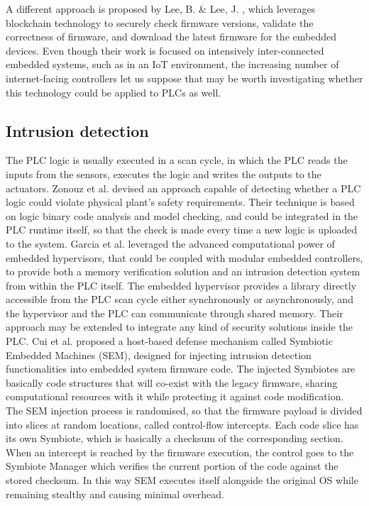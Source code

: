 A different approach is proposed by Lee, B. \& Lee, J. \cite{blockchain}, which leverages blockchain technology to securely check firmware versions,
validate the correctness of firmware, and download the latest firmware for the embedded devices.
Even though their work is focused on intensively inter-connected embedded systems, such as in an IoT environment, the increasing number of internet-facing controllers
let us suppose that may be worth investigating whether this technology could be applied to PLCs as well. 


\subsection{Intrusion detection}

The PLC logic is usually executed in a scan cycle, in which the PLC reads the inputs from the sensors, executes the logic and writes the outputs to the actuators.
Zonouz et al. \cite{logic-analytics} devised an approach capable of detecting whether a PLC logic could violate physical plant's safety requirements.
Their technique is based on logic binary code analysis and model checking, and could be integrated in the PLC runtime itself, so that the check is made every time a new logic is
uploaded to the system.
Garcia et al. \cite{hypervisor-control} leveraged the advanced computational power of embedded hypervisors, that could be coupled with modular embedded controllers,
to provide both a memory verification solution and an intrusion detection system from within the PLC itself.
The embedded hypervisor provides a library directly accessible from the PLC scan cycle either synchronously or asynchronously,
and the hypervisor and the PLC can communicate through shared memory. Their approach may be extended to integrate any kind of security solutions inside the PLC.
Cui et al. \cite{symbiotes} proposed a host-based defense mechanism called Symbiotic Embedded Machines (SEM), designed for injecting
intrusion detection functionalities into embedded system firmware code. The injected Symbiotes are basically code structures that will co-exist
with the legacy firmware, sharing computational resources with it while protecting it against code modification.
The SEM injection process is randomised, so that the firmware payload is divided into slices at random locations, called control-flow intercepts.
Each code slice has its own Symbiote, which is basically a checksum of the corresponding section.
When an intercept is reached by the firmware execution, the control goes to the Symbiote Manager which verifies the current portion of the code against the stored checksum.
In this way SEM executes itself alongside the original OS while remaining stealthy and causing minimal overhead.

